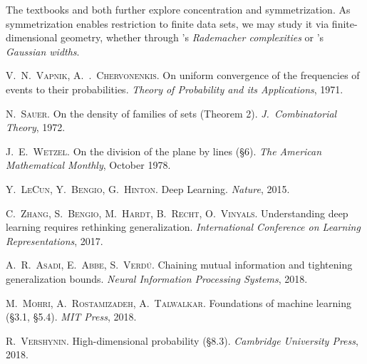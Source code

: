 \documentclass[twocolumn, 11pt]{article}
\theoremstyle{definition}
\begin{document}
        The textbooks \cite{mohri} and \cite{roman} both further explore
        concentration and symmetrization.  As symmetrization enables
        restriction to finite data sets, we may study it via
        finite-dimensional geometry, whether through \cite{mohri}'s
        \emph{Rademacher complexities} or \cite{roman}'s \emph{Gaussian
        widths}.

        {
        \footnotesize
        \begin{thebibliography}{9}


            \textsc{V.\ N.\ Vapnik, A.\ .\ Chervonenkis}.
            On uniform convergence of the frequencies of events to their probabilities.
            \textit{Theory of Probability and its Applications}, 1971.

            \textsc{N.\ Sauer}.
            On the density of families of sets (Theorem 2).
            \textit{J.\ Combinatorial Theory}, 1972.

            \textsc{J.\ E.\ Wetzel}.
            On the division of the plane by lines (\S 6).
            \textit{The American Mathematical Monthly}, October 1978.

            \textsc{Y.\ LeCun, Y.\ Bengio, G.\ Hinton}.
            Deep Learning.
            \textit{Nature}, 2015.

            \textsc{C.\ Zhang, S.\ Bengio, M.\ Hardt, B.\ Recht, O.\ Vinyals}.
            Understanding deep learning requires rethinking generalization.
            \textit{International Conference on Learning Representations}, 2017.

            \textsc{A.\ R.\ Asadi, E.\ Abbe, S.\ Verd\'u}.
            Chaining mutual information and tightening generalization bounds.
            \textit{Neural Information Processing Systems}, 2018.

            \textsc{M.\ Mohri, A.\ Rostamizadeh, A.\ Talwalkar}.
            Foundations of machine learning (\S 3.1, \S 5.4).
            \textit{MIT Press}, 2018.

            \textsc{R.\ Vershynin}.
            High-dimensional probability (\S 8.3).
            \textit{Cambridge University Press}, 2018.

        \end{thebibliography}
        }
\end{document}
